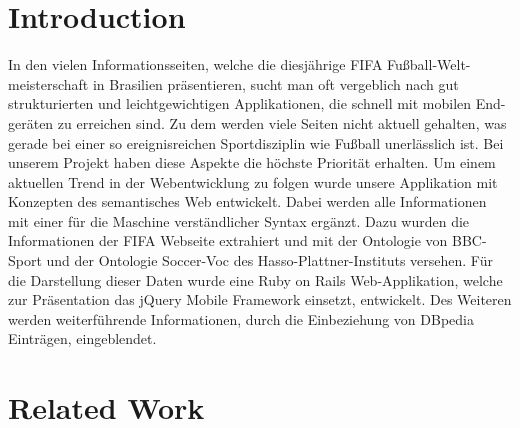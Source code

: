 \documentclass[runningheads,a4paper]{llncs}
\begin{document}
\section{Introduction}

In den vielen Informationsseiten, welche die diesjährige FIFA Fußball-Welt-meisterschaft in Brasilien präsentieren, sucht man oft vergeblich nach gut strukturierten und leichtgewichtigen Applikationen, die schnell mit mobilen End-geräten zu erreichen sind. Zu dem werden viele Seiten nicht aktuell gehalten, was gerade bei einer so ereignisreichen Sportdisziplin wie Fußball unerlässlich ist. Bei unserem Projekt haben diese Aspekte die höchste Priorität erhalten. Um einem aktuellen Trend in der Webentwicklung zu folgen wurde unsere Applikation mit Konzepten des semantisches Web entwickelt. Dabei werden alle Informationen mit einer für die Maschine verständlicher Syntax ergänzt. Dazu wurden die Informationen der FIFA Webseite extrahiert und mit der Ontologie von BBC-Sport und der Ontologie Soccer-Voc des Hasso-Plattner-Instituts versehen. Für die Darstellung dieser Daten wurde eine Ruby on Rails Web-Applikation, welche zur Präsentation das jQuery Mobile Framework einsetzt, entwickelt. Des Weiteren werden weiterführende Informationen, durch die Einbeziehung von DBpedia Einträgen, eingeblendet.    


\section{Related Work}
\end{document}
